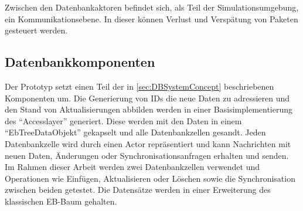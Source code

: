 \documentclass[a4paper,11pt,oneside,%
headsepline,												%
footsepline,												%
bibtotocnumbered									%
]{scrreprt}
\begin{document}
 Zwischen den Datenbankaktoren befindet sich, als Teil der Simulationsumgebung, ein Kommunikationsebene. In dieser können  Verlust und Verspätung von Paketen gesteuert werden.


\subsection{Datenbankkomponenten}
Der Prototyp setzt einen Teil der in \autoref{sec:DBSystemConcept} beschriebenen Komponenten um. Die Generierung von \ac{ID}s die neue Daten zu adressieren und den Stand von Aktualisierungen abbilden werden in einer Basisimplementierung des \enquote{Accesslayer} generiert. Diese werden mit den Daten in einem \enquote{EbTreeDataObjekt} gekapselt und alle Datenbankzellen gesandt. Jeden Datenbankzelle wird durch einen Actor repräsentiert und kann Nachrichten mit neuen Daten, Änderungen oder Synchronisationsanfragen erhalten und senden. Im Rahmen dieser Arbeit werden zwei Datenbankzellen verwendet und Operationen wie Einfügen, Aktualisieren oder Löschen sowie die Synchronisation zwischen beiden getestet. Die Datensätze werden in einer Erweiterung des klassischen \ac{EB-Baum} gehalten.
\end{document}
